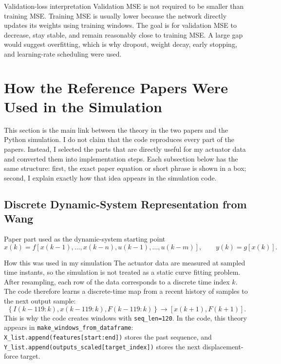 \documentclass[11pt]{article}
\begin{document}
\begin{cautiondecisionbox}{Validation-loss interpretation}
Validation MSE is not required to be smaller than training MSE. Training MSE is usually lower because the network directly updates its weights using training windows. The goal is for validation MSE to decrease, stay stable, and remain reasonably close to training MSE. A large gap would suggest overfitting, which is why dropout, weight decay, early stopping, and learning-rate scheduling were used.
\end{cautiondecisionbox}


\section{How the Reference Papers Were Used in the Simulation}
This section is the main link between the theory in the two papers and the Python simulation. I do not claim that the code reproduces every part of the papers. Instead, I selected the parts that are directly useful for my actuator data and converted them into implementation steps. Each subsection below has the same structure: first, the exact paper equation or short phrase is shown in a box; second, I explain exactly how that idea appears in the simulation code.

\subsection{Discrete Dynamic-System Representation from Wang}
\begin{paperbox}{Paper part used as the dynamic-system starting point \cite{wang2017}}
\begin{equation}
 x(k)=f\left[x(k-1),\ldots,x(k-n),u(k-1),\ldots,u(k-m)\right],
 \qquad y(k)=g[x(k)].
\end{equation}
\end{paperbox}

\begin{implementationbox}{How this was used in my simulation}
The actuator data are measured at sampled time instants, so the simulation is not treated as a static curve fitting problem. After resampling, each row of the data corresponds to a discrete time index $k$. The code therefore learns a discrete-time map from a recent history of samples to the next output sample:
\begin{equation}
\left\{I(k-119:k),x(k-119:k),F(k-119:k)\right\}
\longrightarrow
\left[x(k+1),F(k+1)\right].
\end{equation}
This is why the code creates windows with \texttt{seq\_len=120}. In the code, this theory appears in \texttt{make\_windows\_from\_dataframe}: \texttt{X\_list.append(features[start:end])} stores the past sequence, and \texttt{Y\_list.append(outputs\_scaled[target\_index])} stores the next displacement-force target.
\end{implementationbox}
\end{document}
